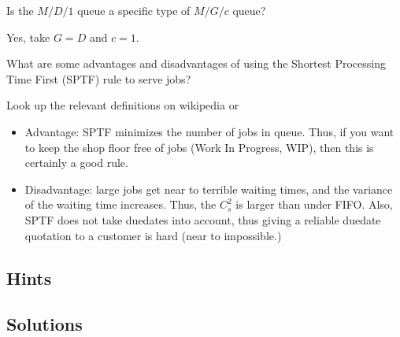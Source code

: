 \begin{exercise}
  Is the $M/D/1$ queue a specific type of  $M/G/c$ queue? 
  \begin{solution}
    Yes, take $G=D$ and $c=1$. 
  \end{solution}
\end{exercise}

\begin{exercise}
  What are some advantages and disadvantages of using the Shortest
  Processing Time First (SPTF) rule to serve jobs? 
  \begin{hint}
Look up the relevant
  definitions on wikipedia or
  \citet{hall91:_queuein_method_servic_manuf}
  \end{hint}
  \begin{solution}
  \begin{itemize}
  \item Advantage: SPTF minimizes the number of jobs in queue. Thus,
    if you want to keep the shop floor free of jobs (Work In Progress,
    WIP), then this is certainly a good rule. 
  \item Disadvantage: large jobs get near to terrible waiting times,
    and the variance of the waiting time increases. Thus, the $C_s^2$
    is larger than under FIFO. Also, SPTF does not take duedates into
    account, thus giving a reliable duedate quotation to a customer is
    hard (near to impossible.)
  \end{itemize}
  \end{solution}
\end{exercise}


\subsection*{Hints}

\subsection*{Solutions}

\clearpage

